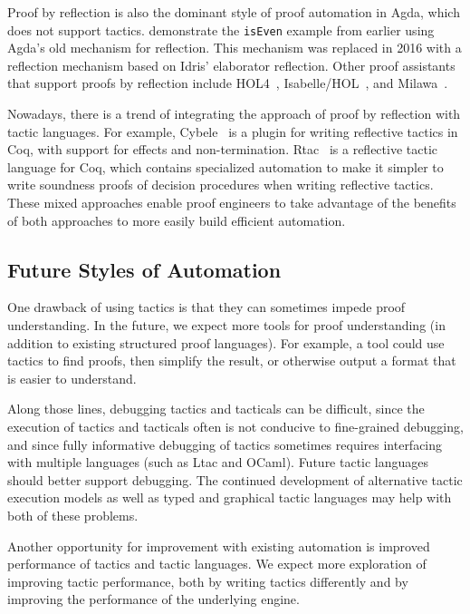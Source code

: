 
Proof by reflection is also the dominant style of proof automation in Agda, which does not support tactics.
\cite{van2012engineering} demonstrate the \lstinline{isEven} example from earlier using Agda's old mechanism for reflection.
This mechanism was replaced in 2016 with a reflection mechanism based on Idris' elaborator reflection.
Other proof assistants that support proofs by reflection include HOL4~\citep{fallenstein2015proof}, 
Isabelle/HOL~\citep{chaieb2008proof}, and Milawa~\citep{Davis2015}. %

Nowadays, there is a trend of integrating the approach of proof by reflection with tactic languages.
For example, Cybele~\citep{claret2013lightweight} is a plugin for writing reflective tactics in Coq, with support for effects and non-termination. %
Rtac~\citep{Malecha2016} is a reflective tactic language for Coq, which contains specialized automation to make it simpler to write soundness proofs of 
decision procedures when writing reflective tactics.
These mixed approaches enable proof engineers to take advantage of the benefits of both approaches
to more easily build efficient automation. %

\subsection{Future Styles of Automation} 
\label{sec:futurestyle}

One drawback of using tactics is that they can sometimes impede proof understanding. 
In the future, we expect more tools
for proof understanding (in addition to existing structured proof languages). For example, a tool could use tactics to find proofs,
then simplify the result, or otherwise output a format that is easier to understand.

Along those lines, debugging tactics and tacticals can be difficult,
since the execution of tactics and tacticals often is not conducive to fine-grained debugging,
and since fully informative debugging of tactics sometimes requires interfacing 
with multiple languages (such as Ltac and OCaml).
Future tactic languages should better support debugging. 
The continued development of alternative tactic execution models
as well as typed and graphical tactic languages may help with both of these problems.

Another opportunity for improvement with existing automation is 
improved performance of tactics and tactic languages.
We expect more exploration of improving tactic performance, both by
writing tactics differently and by improving the performance of the underlying
engine.

